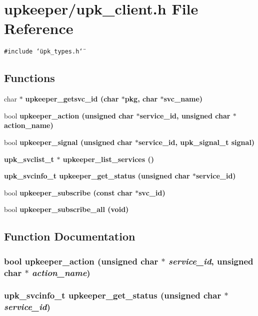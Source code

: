 \section{upkeeper/upk\_\-client.h File Reference}
\label{upk__client_8h}
{\tt \#include \char`\"{}upk\_\-types.h\char`\"{}}\par
\subsection*{Functions}
\begin{CompactItemize}
\item 
char $\ast$ \bf{upkeeper\_\-getsvc\_\-id} (char $\ast$pkg, char $\ast$svc\_\-name)
\item 
bool \bf{upkeeper\_\-action} (unsigned char $\ast$service\_\-id, unsigned char $\ast$action\_\-name)
\item 
bool \bf{upkeeper\_\-signal} (unsigned char $\ast$service\_\-id, \bf{upk\_\-signal\_\-t} signal)
\item 
\bf{upk\_\-svclist\_\-t} $\ast$ \bf{upkeeper\_\-list\_\-services} ()
\item 
\bf{upk\_\-svcinfo\_\-t} \bf{upkeeper\_\-get\_\-status} (unsigned char $\ast$service\_\-id)
\item 
bool \bf{upkeeper\_\-subscribe} (const char $\ast$svc\_\-id)
\item 
bool \bf{upkeeper\_\-subscribe\_\-all} (void)
\end{CompactItemize}


\subsection{Function Documentation}
\subsubsection{\setlength{\rightskip}{0pt plus 5cm}bool upkeeper\_\-action (unsigned char $\ast$ {\em service\_\-id}, unsigned char $\ast$ {\em action\_\-name})}\label{upk__client_8h_9a09dd6a2fae8a842f18c9fb74eebc86}


\subsubsection{\setlength{\rightskip}{0pt plus 5cm}\bf{upk\_\-svcinfo\_\-t} upkeeper\_\-get\_\-status (unsigned char $\ast$ {\em service\_\-id})}\label{upk__client_8h_b96afc35a57a2fd96f06e8e9855bb1de}


